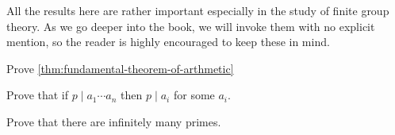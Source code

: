 \documentclass[./algebra-notes.tex]{subfiles}
\begin{document}
All the results here are rather important especially in the study of finite
group theory. As we go deeper into the book, we will invoke them with no
explicit mention, so the reader is highly encouraged to keep these in mind.

\begin{exercise}
    Prove \cref{thm:fundamental-theorem-of-arthmetic}
\end{exercise}

\begin{exercise}
    Prove that if $p \mid a_1 \cdots a_n$ then $p \mid a_i$ for some
    $a_i$.
\end{exercise}

\begin{exercise}
    Prove that there are infinitely many primes.
\end{exercise}
\end{document}
